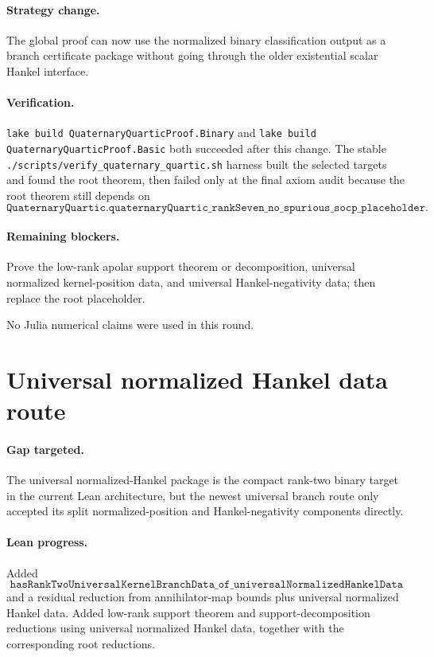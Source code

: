 \documentclass[11pt]{article}
\begin{document}
\paragraph{Strategy change.}
The global proof can now use the normalized binary classification output as a
branch certificate package without going through the older existential scalar
Hankel interface.

\paragraph{Verification.}
\texttt{lake build QuaternaryQuarticProof.Binary} and
\texttt{lake build QuaternaryQuarticProof.Basic} both succeeded after this
change.  The stable \texttt{./scripts/verify\_quaternary\_quartic.sh} harness
built the selected targets and found the root theorem, then failed only at the
final axiom audit because the root theorem still depends on
\[
\texttt{QuaternaryQuartic.quaternaryQuartic\_rankSeven\_no\_spurious\_socp\_placeholder}.
\]

\paragraph{Remaining blockers.}
Prove the low-rank apolar support theorem or decomposition, universal
normalized kernel-position data, and universal Hankel-negativity data; then
replace the root placeholder.

No Julia numerical claims were used in this round.

\section*{Universal normalized Hankel data route}

\paragraph{Gap targeted.}
The universal normalized-Hankel package is the compact rank-two binary target
in the current Lean architecture, but the newest universal branch route only
accepted its split normalized-position and Hankel-negativity components
directly.

\paragraph{Lean progress.}
Added
\[
\texttt{hasRankTwoUniversalKernelBranchData\_of\_universalNormalizedHankelData}
\]
and a residual reduction from annihilator-map bounds plus universal normalized
Hankel data.  Added low-rank support theorem and support-decomposition
reductions using universal normalized Hankel data, together with the
corresponding root reductions.
\end{document}
